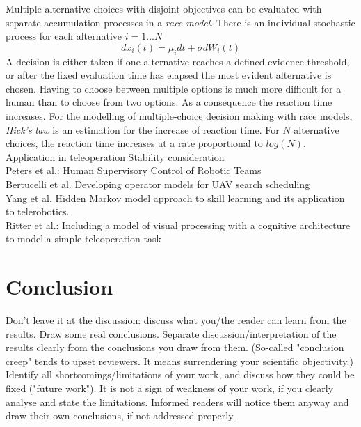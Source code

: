 \documentclass[a4paper,twoside, openright,12pt]{report}
\begin{document}
Multiple alternative choices with disjoint objectives can be evaluated with separate accumulation processes in a \emph{race model}. There is an individual stochastic process for each alternative $i=1...N$
\begin{equation}
dx_i(t) = \mu_i dt + \sigma dW_i(t)
\end{equation}
 A decision is either taken if one alternative reaches a defined evidence threshold, or after the fixed evaluation time has elapsed the most evident alternative is chosen. Having to choose between multiple options is much more difficult for a human than to choose from two options. As a consequence the reaction time increases. For the modelling of multiple-choice decision making with race models, \emph{Hick's law} is an estimation for the increase of reaction time. For $N$ alternative choices, the reaction time increases at a rate proportional to $log(N)$.        
Application in teleoperation 
Stability consideration \\
Peters et al.: Human Supervisory Control of Robotic Teams\\
Bertucelli et al. Developing operator models for {UAV} search scheduling\\
Yang et al. Hidden Markov model approach to skill learning and its application to telerobotics.\\
Ritter et al.: Including a model of visual processing with a cognitive architecture to model a simple teleoperation task\\








\chapter{Conclusion}

Don't leave it at the discussion: discuss what you/the reader can learn from the results. Draw some real conclusions. Separate discussion/interpretation of the results clearly from the conclusions you draw from them. (So-called "conclusion creep" tends to upset reviewers. It means surrendering your scientific objectivity.) Identify all shortcomings/limitations of your work, and discuss how they could be fixed ("future work"). It is not a sign of weakness of your work, if you clearly analyse and state the limitations. Informed readers will notice them anyway and draw their own conclusions, if not addressed properly.
\end{document}
